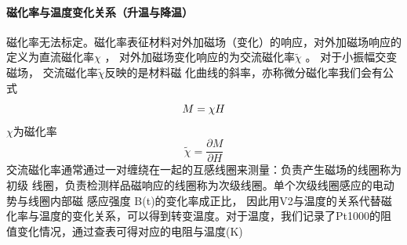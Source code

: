 \documentclass{ctexart}
\theoremstyle{ansstyle}
\begin{document}
\paragraph{磁化率与温度变化关系（升温与降温）} 磁化率无法标定。磁化率表征材料对外加磁场（变化）的响应，对外加磁场响应的定义为直流磁化率$ \chi $ ，
对外加磁场变化响应的为交流磁化率$ \widetilde{\chi}  $ 。 对于小振幅交变磁场， 交流磁化率$ \widetilde{\chi}  $反映的是材料磁
化曲线的斜率，亦称微分磁化率我们会有公式
\begin{equation}
    \centering
	M=\chi H
\end{equation}
$ \chi $为磁化率 
\begin{equation}
    \widetilde{\chi} =\frac{\partial M}{\partial H} 
\end{equation}
交流磁化率通常通过一对缠绕在一起的互感线圈来测量：负责产生磁场的线圈称为初级
线圈，负责检测样品磁响应的线圈称为次级线圈。单个次级线圈感应的电动势与线圈内部磁
感应强度 B(t)的变化率成正比，
因此用V2与温度的关系代替磁化率与温度的变化关系，可以得到转变温度。对于温度，我们记录了Pt1000的阻值变化情况，通过查表可得对应的电阻与温度(K)\\
\end{document}
